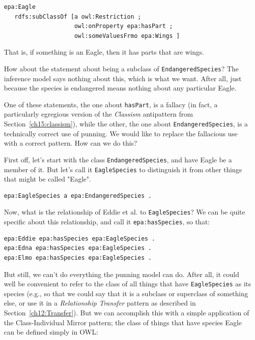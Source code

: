 \begin{lstlisting}
epa:Eagle 
   rdfs:subClassOf [a owl:Restriction ;
                    owl:onProperty epa:hasPart ;
                    owl:someValuesFrmo epa:Wings ]
\end{lstlisting}

That is, if something is an Eagle, then it has parts that are wings. 

How about the statement about being a subclass of \texttt{EndangeredSpecies}?  
The inference model says nothing about this, which is what we want.  After all, 
just because the species is endangered means nothing about any particular 
Eagle.  

One of these statements, the one about \texttt{hasPart}, is a fallacy (in fact, a particularly
egregious version 
of the \emph{Classism} antipattern from Section~\ref{ch15:classism}), 
while the other, the one about \texttt{EndangeredSpecies},
is a technically correct use of punning.  We would like to replace the fallacious use with a 
correct pattern.  How can we do this? 

First off, let's start with the class \texttt{EndangeredSpecies}, and have 
Eagle be a member of it.  But let's call it \texttt{EagleSpecies} to distinguish it from other 
things that might be called "Eagle". 

\begin{lstlisting}
epa:EagleSpecies a epa:EndangeredSpecies .
\end{lstlisting}

Now, what is the relationship of Eddie et al. to \texttt{EagleSpecies}?  We can be
quite specific about this relationship, and call it \texttt{epa:hasSpecies}, so that:

\begin{lstlisting}
epa:Eddie epa:hasSpecies epa:EagleSpecies .
epa:Edna epa:hasSpecies epa:EagleSpecies .
epa:Elmo epa:hasSpecies epa:EagleSpecies . 
\end{lstlisting}

But still, we can't do everything the punning model can do.  After all, it 
could well be convenient to refer to the class of all things that have \texttt{EagleSpecies} 
as its species  (e.g., so that we could say that it is a subclass or superclass of
something else, or use it in a \emph{Relationship Transfer} pattern as described in 
Section~\ref{ch12:Transfer}).  But we can accomplish this with a simple application of the 
Class-Individual Mirror pattern;
the class of things that have species Eagle can be defined simply in OWL:

